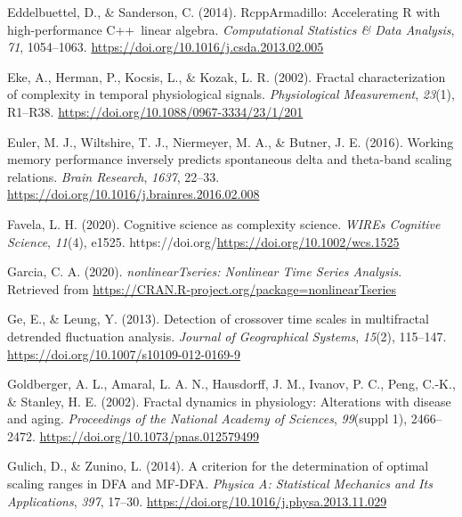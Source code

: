 \documentclass[
  man]{apa6}
\newlength{\cslhangindent}
\newlength{\cslentryspacingunit} %
\newenvironment{CSLReferences}[2] %
 {%
  \setlength{\parindent}{0pt}
  \ifodd #1
  \let\oldpar\par
  \def\par{\hangindent=\cslhangindent\oldpar}
  \fi
  \setlength{\parskip}{#2\cslentryspacingunit}
 }%
 {}
\begin{document}
\begin{CSLReferences}{1}{0}
\leavevmode{}%
Eddelbuettel, D., \& Sanderson, C. (2014). {RcppArmadillo}: {Accelerating} {R} with high-performance {C}++~linear algebra. \emph{Computational Statistics \& Data Analysis}, \emph{71}, 1054--1063. \url{https://doi.org/10.1016/j.csda.2013.02.005}

\leavevmode{}%
Eke, A., Herman, P., Kocsis, L., \& Kozak, L. R. (2002). Fractal characterization of complexity in temporal physiological signals. \emph{Physiological Measurement}, \emph{23}(1), R1--R38. \url{https://doi.org/10.1088/0967-3334/23/1/201}

\leavevmode{}%
Euler, M. J., Wiltshire, T. J., Niermeyer, M. A., \& Butner, J. E. (2016). Working memory performance inversely predicts spontaneous delta and theta-band scaling relations. \emph{Brain Research}, \emph{1637}, 22--33. \url{https://doi.org/10.1016/j.brainres.2016.02.008}

\leavevmode{}%
Favela, L. H. (2020). Cognitive science as complexity science. \emph{WIREs Cognitive Science}, \emph{11}(4), e1525. https://doi.org/\url{https://doi.org/10.1002/wcs.1525}

\leavevmode{}%
Garcia, C. A. (2020). \emph{{nonlinearTseries}: {Nonlinear} {Time} {Series} {Analysis}}. Retrieved from \url{https://CRAN.R-project.org/package=nonlinearTseries}

\leavevmode{}%
Ge, E., \& Leung, Y. (2013). Detection of crossover time scales in multifractal detrended fluctuation analysis. \emph{Journal of Geographical Systems}, \emph{15}(2), 115--147. \url{https://doi.org/10.1007/s10109-012-0169-9}

\leavevmode{}%
Goldberger, A. L., Amaral, L. A. N., Hausdorff, J. M., Ivanov, P. C., Peng, C.-K., \& Stanley, H. E. (2002). Fractal dynamics in physiology: {Alterations} with disease and aging. \emph{Proceedings of the National Academy of Sciences}, \emph{99}(suppl 1), 2466--2472. \url{https://doi.org/10.1073/pnas.012579499}

\leavevmode{}%
Gulich, D., \& Zunino, L. (2014). A criterion for the determination of optimal scaling ranges in {DFA} and {MF}-{DFA}. \emph{Physica A: Statistical Mechanics and Its Applications}, \emph{397}, 17--30. \url{https://doi.org/10.1016/j.physa.2013.11.029}


\end{CSLReferences}
\end{document}
